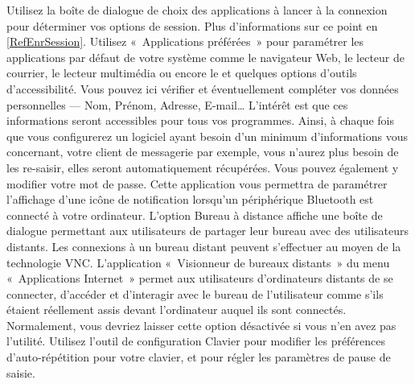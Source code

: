Utilisez la boîte de dialogue de choix des applications à lancer à la connexion pour déterminer vos options de session. Plus d'informations sur ce point en \ref{RefEnrSession}.
Utilisez «~Applications préférées~» pour paramétrer les applications par défaut de votre système comme le navigateur Web, le lecteur de courrier, le lecteur multimédia ou encore le  et quelques options d'outils d'accessibilité.
Vous pouvez ici vérifier et éventuellement compléter vos données personnelles --- Nom, Prénom, Adresse, E-mail\ldots{} L'intérêt est que ces informations seront accessibles pour tous vos programmes. Ainsi, à chaque fois que vous configurerez un logiciel ayant besoin d'un minimum d'informations vous concernant, votre client de messagerie par exemple, vous n'aurez plus besoin de les re-saisir, elles seront automatiquement récupérées.  Vous pouvez également y modifier votre mot de passe.
Cette application vous permettra de paramétrer l'affichage d'une icône de notification lorsqu'un périphérique Bluetooth est connecté à votre ordinateur.
L'option Bureau à distance affiche une boîte de dialogue permettant aux utilisateurs de partager leur bureau avec des utilisateurs distants. Les connexions à un bureau distant peuvent s'effectuer au moyen de la technologie VNC. L'application «~Visionneur de bureaux distants~» du menu «~Applications \FlecheDroite Internet~» permet aux utilisateurs d'ordinateurs distants de se connecter, d'accéder et d'interagir avec le bureau de l'utilisateur comme s'ils étaient réellement assis devant l'ordinateur auquel ils sont connectés. Normalement, vous devriez laisser cette option désactivée si vous n'en avez pas l'utilité.
Utilisez l'outil de configuration Clavier pour modifier les préférences d'auto-répétition pour votre clavier, et pour régler les paramètres de pause de saisie.
